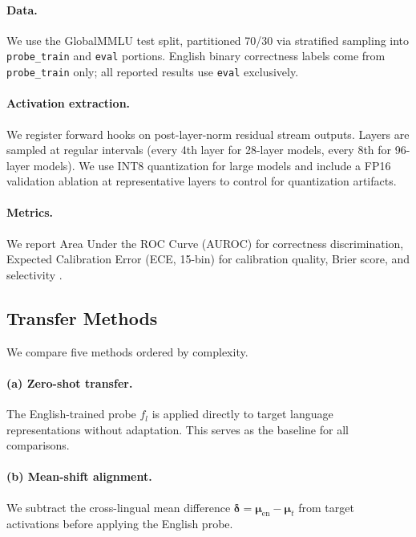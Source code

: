 \paragraph{Data.} We use the GlobalMMLU test split, partitioned 70/30 via stratified sampling into \texttt{probe\_train} and \texttt{eval} portions. English binary correctness labels come from \texttt{probe\_train} only; all reported results use \texttt{eval} exclusively.

\paragraph{Activation extraction.} We register forward hooks on post-layer-norm residual stream outputs. Layers are sampled at regular intervals (every 4th layer for 28-layer models, every 8th for 96-layer models). We use INT8 quantization for large models and include a FP16 validation ablation at representative layers to control for quantization artifacts.

\paragraph{Metrics.} We report Area Under the ROC Curve (AUROC) for correctness discrimination, Expected Calibration Error (ECE, 15-bin) for calibration quality, Brier score, and selectivity \citep{hewitt2019control}. %

\subsection{Transfer Methods}
\label{sec:transfer}

We compare five methods ordered by complexity.

\paragraph{(a) Zero-shot transfer.} The English-trained probe $f_l$ is applied directly to target language representations without adaptation. This serves as the baseline for all comparisons.

\paragraph{(b) Mean-shift alignment.} We subtract the cross-lingual mean difference $\boldsymbol{\delta} = \boldsymbol{\mu}_{\text{en}} - \boldsymbol{\mu}_t$ from target activations before applying the English probe.

